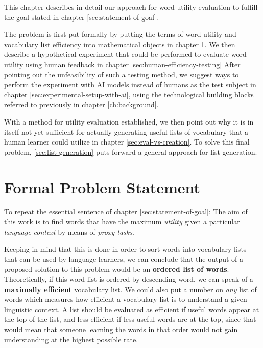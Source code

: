 This chapter describes in detail our approach for word utility evaluation to fulfill the goal stated in chapter \ref{sec:statement-of-goal}.

The problem is first put formally by putting the terms of word utility and vocabulary list efficiency into mathematical objects in chapter \ref{sec:formal-problem-statement}.
We then describe a hypothetical experiment that could be performed to evaluate word utility using human feedback in chapter \ref{sec:human-efficiency-testing}
After pointing out the unfeasibility of such a testing method, we suggest ways to perform the experiment with AI models instead of humans as the test subject in chapter \ref{sec:experimental-setup-with-ai}, using the technological building blocks referred to previously in chapter \ref{ch:background}.

With a method for utility evaluation established, we then point out why it is in itself not yet sufficient for actually generating useful lists of vocabulary that a human learner could utilize in chapter \ref{sec:eval-vs-creation}.
To solve this final problem, \ref{sec:list-generation} puts forward a general approach for list generation.

\section{Formal Problem Statement} \label{sec:formal-problem-statement}


To repeat the essential sentence of chapter \ref{sec:statement-of-goal}:
The aim of this work is to find words that have the maximum \textit{utility} given a particular \textit{language context} by means of \textit{proxy tasks}.

Keeping in mind that this is done in order to sort words into vocabulary lists that can be used by language learners, we can conclude that the output of a proposed solution to this problem would be an \textbf{ordered list of words}.
Theoretically, if this word list is ordered by descending word, we can speak of a \textbf{maximally efficient} vocabulary list.
We could also put a number on \textit{any} list of words which measures how efficient a vocabulary list is to understand a given linguistic context.
A list should be evaluated as efficient if useful words appear at the top of the list, and less efficient if less useful words are at the top, since that would mean that someone learning the words in that order would not gain understanding at the highest possible rate.

